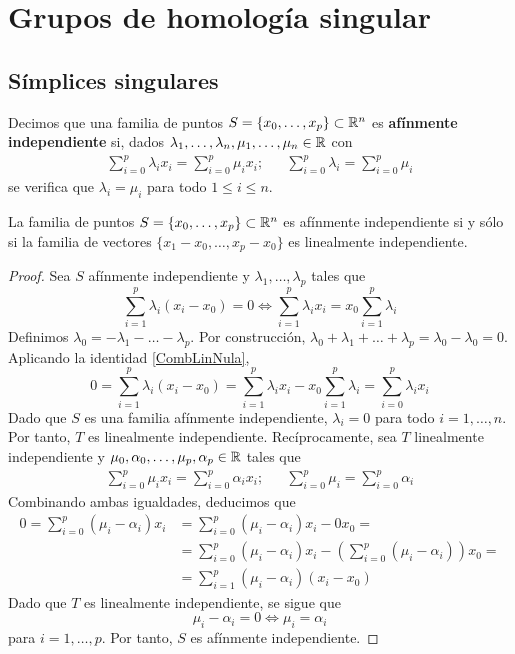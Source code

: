 \setchapterpreamble[u]{\margintoc}

\chapter{Grupos de homología singular}
\section{Símplices singulares}
Decimos que una familia de puntos $S=\{x_0, \dots, x_p\} \subset \mathbb{R}^n$ es \textbf{afínmente independiente} si, dados $\lambda_1,\dots,\lambda_n, \mu_1,\dots,\mu_n \in \mathbb{R}$ con
	\begin{align*}
		\sum^p_{i=0}\lambda_ix_i=\sum^p_{i=0}\mu_ix_i; && \sum^p_{i=0}\lambda_i=\sum^p_{i=0}\mu_i
	\end {align*}
se verifica que $\lambda_i=\mu_i$ para todo $1\leq i \leq n$.

\begin{proposition}
	La familia de puntos $S=\{x_0, \dots, x_p\} \subset \mathbb{R}^n$ es afínmente independiente si y sólo si la familia de vectores $\{x_1-x_0,\dots,x_p-x_0\}$ es linealmente independiente.
\end{proposition}

\begin{proof}
	Sea $S$ afínmente independiente y $\lambda_1,\dots, \lambda_p$ tales que
	\begin{equation}\label{CombLinNula}
		\sum^p_{i=1}\lambda_i(x_i-x_0)=0 \iff \sum^p_{i=1}\lambda_ix_i=x_0\sum^p_{i=1}\lambda_i
	\end{equation}
	Definimos $\lambda_0=-\lambda_1-\dots-\lambda_p$.
	Por construcción, $\lambda_0+\lambda_1+\dots+\lambda_p=\lambda_0-\lambda_0=0$.
	Aplicando la identidad \eqref{CombLinNula},
		\[0=\sum^p_{i=1}\lambda_i(x_i-x_0)=\sum^p_{i=1}\lambda_i x_i-x_0\sum^p_{i=1}\lambda_i=\sum^p_{i=0}\lambda_i x_i\]
	Dado que $S$ es una familia afínmente independiente, $\lambda_i=0$ para todo $i=1,\dots,n$.
	Por tanto, $T$ es linealmente independiente.
	Recíprocamente, sea $T$ linealmente independiente y $\mu_0,\alpha_0,\dots,\mu_p,\alpha_p \in \mathbb{R}$ tales que
	\begin{align*}
		\sum_{i=0}^p \mu_ix_i=\sum_{i=0}^p \alpha_ix_i; && \sum_{i=0}^p \mu_i=\sum_{i=0}^p \alpha_i
	\end{align*}
	Combinando ambas igualdades, deducimos que
	\begin{align*}
	0=\sum^p_{i=0}(\mu_i-\alpha_i)x_i
		&=\sum^p_{i=0}(\mu_i-\alpha_i)x_i-0x_0=\\
		&=\sum^p_{i=0}(\mu_i-\alpha_i)x_i-
		\left(\sum^p_{i=0}(\mu_i-\alpha_i)\right)x_0=\\
		&=\sum^p_{i=1}(\mu_i-\alpha_i)(x_i-x_0)
	\end{align*}
	Dado que $T$ es linealmente independiente, se sigue que
		\[\mu_i-\alpha_i=0 \iff \mu_i=\alpha_i\]
	para $i=1,\dots,p$.
	Por tanto, $S$ es afínmente independiente.
\end{proof}

